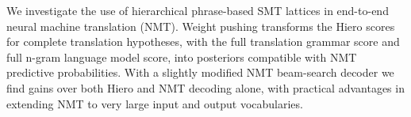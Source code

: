 We investigate the use of hierarchical phrase-based SMT lattices in end-to-end neural machine translation (NMT). Weight pushing transforms the Hiero scores for complete translation hypotheses, with the full translation grammar score and full n-gram language model score, into posteriors compatible with NMT predictive probabilities. With a slightly modified NMT beam-search decoder we find gains over both Hiero and NMT decoding alone, with practical advantages in extending NMT to very large input and output vocabularies.

